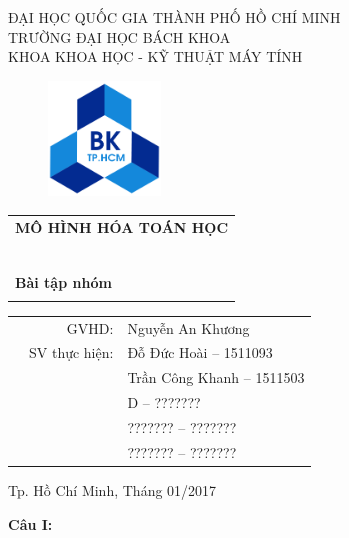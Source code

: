 \documentclass[a4paper]{article}
\begin{document}
\begin{titlepage}
\begin{center}
ĐẠI HỌC QUỐC GIA THÀNH PHỐ HỒ CHÍ MINH \\
TRƯỜNG ĐẠI HỌC BÁCH KHOA \\
KHOA KHOA HỌC - KỸ THUẬT MÁY TÍNH 
\end{center}

\vspace{1cm}

\begin{figure}[h!]
\begin{center}
\includegraphics[width=3cm]{Images/hcmut.png}
\end{center}
\end{figure}

\vspace{1cm}


\begin{center}
\begin{tabular}{c}
\multicolumn{1}{l}{\textbf{{\Large\hspace{1 cm} MÔ HÌNH HÓA TOÁN HỌC\hspace{1 cm} }}}\\
~~\\
\hline
\\
\multicolumn{1}{l}{\textbf{{\Huge\hspace{1.7 cm} Bài tập nhóm}}}\\
\\
\hline
\end{tabular}
\end{center}

\vspace{1.5cm}

\begin{table}[h]
\begin{tabular}{rrl}
\hspace{5 cm} & GVHD: & Nguyễn An Khương\\

& SV thực hiện: & Đỗ Đức Hoài -- 1511093 \\
& & Trần Công Khanh -- 1511503 \\
& & D -- ??????? \\
& & ??????? -- ??????? \\
& & ??????? -- ??????? \\
\end{tabular}
\end{table}
\vspace{1.5cm}
\begin{center}
{\footnotesize Tp. Hồ Chí Minh, Tháng 01/2017}
\end{center}
\end{titlepage}
\newpage
\textbf{{\Large Câu I: }}
\\
\end{document}
